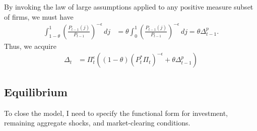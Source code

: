 \documentclass[12 pt, oneside]{article}
\theoremstyle{definition}
\theoremstyle{definition}
\theoremstyle{definition}
\begin{document}
By invoking the law of large assumptions applied to any positive measure subset of firms, we must have
\begin{align*}
  \int_{1 - \theta}^1 \left(\frac{P_{t - 1}(j)}{P_{t - 1}}\right)^{ - \epsilon}\,dj & = \theta\int_0^1 \left(\frac{P_{t - 1}(j)}{P_{t - 1}}\right)^{ - \epsilon}\,dj = \theta \Delta_{t - 1}^p.
\end{align*}
Thus, we acquire
\begin{align}\label{eq:price dispersion evol}
  \Delta_t & = \Pi_t^{\epsilon}((1 - \theta) (P_t^* \Pi_t)^{-\epsilon} + \theta \Delta_{t - 1}^p)
\end{align}


\subsection{Equilibrium}
To close the model, I need to specify the functional form for investment, remaining aggregate shocks, and market-clearing conditions.\\
\end{document}
